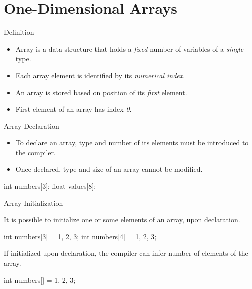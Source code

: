 \documentclass[compress]{beamer}
\begin{document}
\prepareCover

\section{One-Dimensional Arrays}

\begin{slide}
	\begin{block}{Definition}

	\begin{itemize}
	\item[] Array is a data structure that holds a \emph{fixed} number of variables of a \emph{single} type.
	\item[] Each array element is identified by its \emph{numerical index}.
	\item[] An array is stored based on position of its \emph{first} element.
	\item[] First element of an array has index \emph{0}.
	\end{itemize}

	\end{block}
\end{slide}

\begin{slide}
	\begin{block}{Array Declaration}

	\begin{itemize}
	\item[] To declare an array, type and number of its elements must be introduced to the compiler.
	\item[] Once declared, type and size of an array cannot be modified.
	\end{itemize}

	\begin{terminal}
	int numbers[3];
	float values[8];
	\end{terminal}

	\end{block}
\end{slide}

\begin{slide}
	\begin{block}{Array Initialization}

	It is possible to initialize one or some elements of an array, upon declaration.

	\begin{terminal}
	int numbers[3] = {1, 2, 3};
	int numbers[4] = {1, 2, 3};
	\end{terminal}

	If initialized upon declaration, the compiler can infer number of elements of the array.

	\begin{terminal}
	int numbers[] = {1, 2, 3};
	\end{terminal}

	\end{block}
\end{slide}
\end{document}
